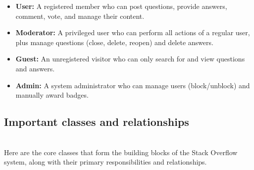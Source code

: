 \begin{itemize}
\item
\protect{}\label{5iBntwoPbrtTceVW61A7h}
\textbf{User:} A registered member who can post questions, provide answers, comment, vote, and manage their content.
\item
\protect{}\label{_ti4mfBcRXwkplG8q36h2}
\textbf{Moderator:} A privileged user who can perform all actions of a regular user, plus manage questions (close, delete, reopen) and delete answers.
\item
\protect{}\label{a5IM9zVIb2p_23AYfjAZG}
\textbf{Guest:} An unregistered visitor who can only search for and view questions and answers.
\item
\protect{}\label{IV8d8v6oCcAgFKN4ewGT8}
\textbf{Admin:} A system administrator who can manage users (block/unblock) and manually award badges.
\end{itemize}

\subsection{Important classes and relationships}\label{QV-I41dJnKXhl5w53YSFW}
\\
Here are the core classes that form the building blocks of the Stack Overflow system, along with their primary responsibilities and relationships.

